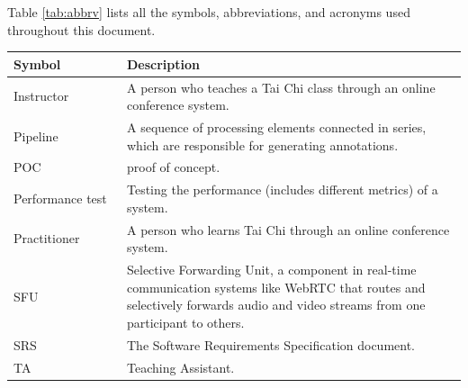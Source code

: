 \documentclass[12pt, titlepage]{article}
\begin{document}
Table \ref{tab:abbrv} lists all the symbols, abbreviations, and acronyms used
throughout this document.
\renewcommand{\arraystretch}{1.2}
\begin{table}[H]
  \centering
  \begin{tabular}{L{0.25\linewidth}L{0.8\linewidth}} \toprule
    \textbf{Symbol}                  & \textbf{Description}                                                                                                                                                                    \\ \midrule
    Instructor                 & A person who teaches a Tai Chi class through an online conference system.                                                                                                          \\
    Pipeline                   & A sequence of processing elements connected in series, which are responsible for generating annotations.                                                                           \\
    POC                        & proof of concept.                                                                                                                                                                  \\
    Performance test           & Testing the performance (includes different metrics) of a system.                                                                                                                   \\
    Practitioner               & A person who learns Tai Chi through an online conference system.                                                                                                                   \\
    SFU                        & Selective Forwarding Unit, a component in real-time communication systems like WebRTC that routes and selectively forwards audio and video streams from one participant to others. \\
    SRS                        & The Software Requirements Specification document.                                                                                                                                  \\
    TA                         & Teaching Assistant.                                                                                                                                                                \\

\end{tabular}
\end{table}
\end{document}
